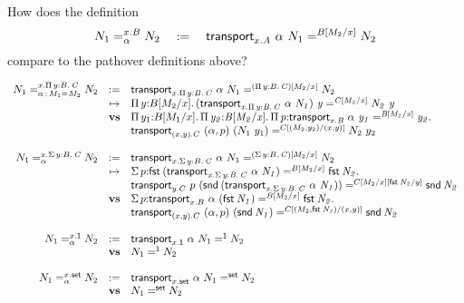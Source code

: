 How does the definition
\[ \iidover{x.B}{\alpha}{N_1}{N_2}
\quad := \quad
\iid{\subst{B}{M_2}{x}}{\transport{x.A}{\alpha}{N_1}}{N_2} \]
compare to the pathover definitions above?

\begin{small}
\[\begin{array}{rclll}
\iidover{x.\picl{y}{B}{C}}{\tptm{\alpha}{\iid{}{M_1}{M_2}}}{N_1}{N_2}
&:=& \iid{\subst{(\picl yBC)}{M_2}{x}}{\transport{x.\picl yBC}{\alpha}{N_1}}{N_2} \\
&\mapsto& \picl{y}{\subst{B}{M_2}{x}}{\iid{\subst{C}{M_2}{x}}{(\transport{x.\picl
yBC}{\alpha}{N_1})~y}{N_2~y}} \\
&\mathbf{vs}& \picl{y_1}{\subst{B}{M_1}{x}}{\picl{y_2}{\subst{B}{M_2}{x}}{
\picl{p}{\iid{\subst{B}{M_2}{x}}{\transport{x.B}{\alpha}{y_1}}{y_2}}}} \\
&&\iid{\subst{C}{(M_2,y_2)}{(x,y)}}
{\transport{(x,y).C}{(\alpha,p)}{(N_1~y_1)}}{N_2~y_2} \\
&&\\
\iidover{x.\sigmacl{y}{B}{C}}{\alpha}{N_1}{N_2}
&:=& \iid{\subst{(\sigmacl yBC)}{M_2}{x}}{\transport{x.\sigmacl yBC}{\alpha}{N_1}}{N_2} \\
&\mapsto& \sigmacl{p}{\iid{\subst{B}{M_2}{x}}{\fst{(\transport{x.\sigmacl
yBC}{\alpha}{N_1})}}{\fst{N_2}}}{} \\
&&\iid{\subst{\subst{C}{M_2}{x}}{\fst{N_2}}{y}}{\transport{y.C}{p}{(\snd{(\transport{x.\sigmacl
yBC}{\alpha}{N_1})})}}{\snd{N_2}} \\
&\mathbf{vs}&
\sigmacl{p}{\iid{\subst{B}{M_2}{x}}{\transport{x.B}{\alpha}{(\fst{N_1})}}{\fst{N_2}}}{}
\\
&&\iid{\subst{C}{(M_2,\fst{N_2})}{(x,y)}}{\transport{(x,y).C}{(\alpha,p)}{(\snd{N_1})}}{\snd{N_2}} \\
&&\\
\iidover{x.\unit}{\alpha}{N_1}{N_2}
&:=& \iid{\unit}{\transport{x.\unit}{\alpha}{N_1}}{N_2} \\
&\mathbf{vs}& \iid{\unit}{N_1}{N_2} \\
&&\\
\iidover{x.\set}{\alpha}{N_1}{N_2}
&:=& \iid{\set}{\transport{x.\set}{\alpha}{N_1}}{N_2} \\
&\mathbf{vs}& \iid{\set}{N_1}{N_2} \\
\end{array}\]
\end{small}

